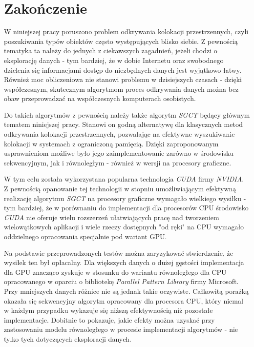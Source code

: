 \documentclass[12pt]{article}
\begin{document}
\newpage

\section{Zakończenie}
\label{sec:fin}

W niniejszej pracy poruszono problem odkrywania kolokacji przestrzennych, czyli poszukiwania typów obiektów często występujących blisko siebie. Z pewnością tematyka ta należy do jednych z ciekawszych zagadnień, jeżeli chodzi o eksplorację danych - tym bardziej, że w dobie Internetu oraz swobodnego dzielenia się informacjami dostęp do niezbędnych danych jest wyjątkowo łatwy. Również moc obliczeniowa nie stanowi problemu w dzisiejszych czasach - dzięki współczesnym, skutecznym algorytmom proces odkrywania danych można bez obaw przeprowadzać na współczesnych komputerach osobistych.

Do takich algorytmów z pewnością należy także algorytm \textit{SGCT} \cite{chinczyki} będący głównym tematem niniejszej pracy. Stanowi on godną alternatywę dla klasycznych metod odkrywania kolokacji przestrzennych, pozwalając na efektywne wyszukiwanie kolokacji w systemach z ograniczoną pamięcią. Dzięki zaproponowanym usprawnieniom możliwe było jego zaimplementowanie zarówno w środowisku sekwencyjnym, jak i równoległym - również w wersji na procesory graficzne.

W tym celu została wykorzystana popularna technologia \textit{CUDA} firmy \textit{NVIDIA}. Z pewnością opanowanie tej technologii w stopniu umożliwiającym efektywną realizację algorytmu \textit{SGCT} na procesory graficzne wymagało wielkiego wysiłku - tym bardziej, że w porównaniu do implementacji dla procesorów CPU środowisko \textit{CUDA} nie oferuje wielu rozszerzeń ułatwiających pracę nad tworzeniem wielowątkowych aplikacji i wiele rzeczy dostępnych "od ręki" na CPU wymagało oddzielnego opracowania specjalnie pod wariant GPU.

Na podstawie przeprowadzonych testów można zaryzykować stwierdzenie, że wysiłek ten był opłacalny. Dla większych danych o dużej gęstości implementacja dla GPU znacząco zyskuje w stosunku do wariantu równoległego dla CPU opracowanego w oparciu o bibliotekę \textit{Parallel Pattern Library} firmy Microsoft. Przy mniejszych danych różnice nie są jednak takie oczywiste.
Całkowitą porażką okazała się sekwencyjny algorytm opracowany dla procesora CPU, który niemal w każdym przypadku wykazuje się niższą efektywnością niż pozostałe implementacje. Dobitnie to pokazuje, jakie efekty można uzyskać przy zastosowaniu modelu równoległego w procesie implementacji algorytmów - nie tylko tych dotyczących eksploracji danych.
\end{document}
